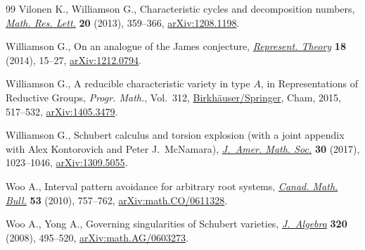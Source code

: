 \documentclass[10pt,a4paper]{amsart}
\numberwithin{equation}{section}
\begin{document}
\begin{thebibliography}{99}
Vilonen K., Williamson G., Characteristic cycles and decomposition numbers,
 \href{https://doi.org/10.4310/MRL.2013.v20.n2.a11}{\textit{Math. Res. Lett.}} \textbf{20} (2013), 359--366, \href{https://arxiv.org/abs/1208.1198}{arXiv:1208.1198}.

Williamson G., On an analogue of the {J}ames conjecture, \href{https://doi.org/10.1090/S1088-4165-2014-00447-3}{\textit{Represent.
 Theory}} \textbf{18} (2014), 15--27, \href{https://arxiv.org/abs/1212.0794}{arXiv:1212.0794}.

Williamson G., A reducible characteristic variety in type {$A$}, in
 Representations of Reductive Groups, \textit{Progr. Math.}, Vol.~312,
 \href{https://doi.org/10.1007/978-3-319-23443-4_19}{Birkh\"auser/Springer}, Cham, 2015, 517--532, \href{https://arxiv.org/abs/1405.3479}{arXiv:1405.3479}.

Williamson G., Schubert calculus and torsion explosion (with a joint appendix
 with Alex Kontorovich and Peter J.~McNamara), \href{https://doi.org/10.1090/jams/868}{\textit{J.~Amer. Math. Soc.}}
 \textbf{30} (2017), 1023--1046, \href{https://arxiv.org/abs/1309.5055}{arXiv:1309.5055}.

Woo A., Interval pattern avoidance for arbitrary root systems, \href{https://doi.org/10.4153/CMB-2010-080-2}{\textit{Canad.
 Math. Bull.}} \textbf{53} (2010), 757--762, \href{https://arxiv.org/abs/math.CO/0611328}{arXiv:math.CO/0611328}.

Woo A., Yong A., Governing singularities of {S}chubert varieties,
 \href{https://doi.org/10.1016/j.jalgebra.2007.12.016}{\textit{J.~Algebra}} \textbf{320} (2008), 495--520, \href{https://arxiv.org/abs/math.AG/0603273}{arXiv:math.AG/0603273}.

\end{thebibliography}
\end{document}
